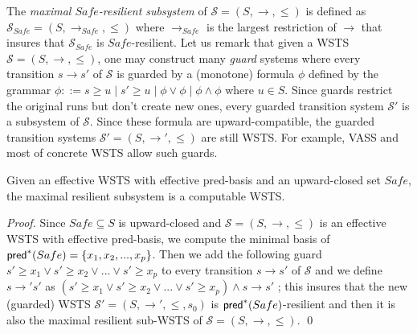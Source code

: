 The \emph{maximal $Safe$-resilient subsystem} of $\mathscr{S}=(S,\rightarrow,\leq)$ is defined as $\mathscr{S}_{Safe}=(S,\rightarrow_{Safe},\leq)$ where $\rightarrow_{Safe}$ is the largest restriction of $\rightarrow$ that insures that $\mathscr{S}_{Safe}$ is $Safe$-resilient.
Let us remark that given a WSTS $\mathscr{S}=(S, \rightarrow, \leq)$, one may construct many \emph{guard} systems where every transition $s \rightarrow s'$ of $\mathscr{S}$ is guarded by a (monotone) formula $\phi$ defined by the grammar $\phi ::= s \geq u \mid s' \geq u \mid \phi \vee \phi \mid \phi \wedge \phi$ where $u \in S$. Since guards restrict the original runs but don't create new ones, every guarded transition system $\mathscr{S'}$ is a subsystem of $\mathscr{S}$. Since these formula are upward-compatible, the guarded transition systems $\mathscr{S'}=(S, \rightarrow', \leq)$ are still WSTS.
%
For example, VASS and most of concrete WSTS allow such guards.

\begin{theorem}{}
Given an effective WSTS with effective pred-basis and an upward-closed set $Safe$, the maximal resilient subsystem is a computable WSTS.
\end{theorem}

\begin{proof}
Since $Safe \subseteq S$ is upward-closed and $\mathscr{S}=(S, \rightarrow, \leq)$ is an effective WSTS with effective pred-basis, we compute the minimal basis of $\textsf{pred}^*(Safe)=\{x_1,x_2,...,x_p\}$. 
%
%
Then we add the following guard $s' \geq x_1  	\vee s' \geq x_2  	\vee...	\vee s' \geq x_p$ to every transition $s \rightarrow s'$ of $\mathscr{S}$ and we define  $s \rightarrow' s'$ as $(s' \geq x_1  	\vee s' \geq x_2  	\vee...	\vee s' \geq x_p) \wedge s \rightarrow s'$ ; this insures that the new (guarded) WSTS $\mathscr{S'}=(S, \rightarrow', \leq,s_0)$ is $\textsf{pred}^*(Safe)$-resilient and then it is also the maximal resilient sub-WSTS of $\mathscr{S}=(S, \rightarrow, \leq)$. \qed
		\end{proof}
%



